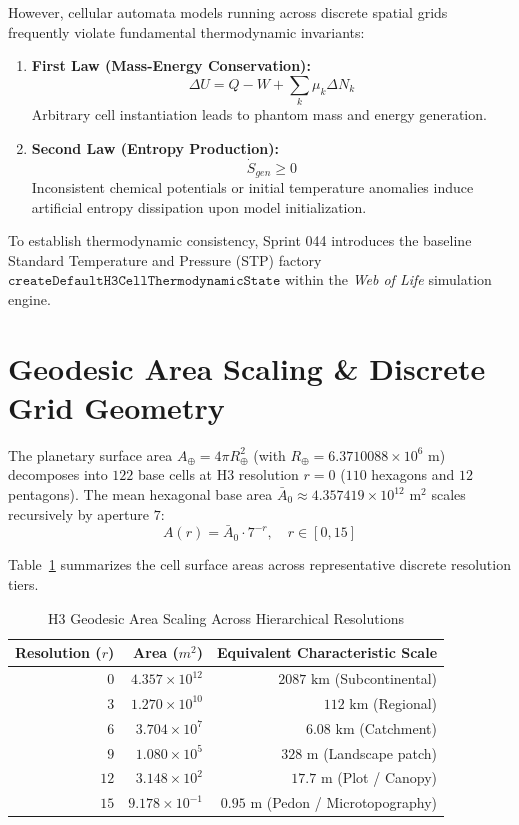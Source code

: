\documentclass[10pt,journal,compsoc]{IEEEtran}
\begin{document}
However, cellular automata models running across discrete spatial grids frequently violate fundamental thermodynamic invariants:
\begin{enumerate}
    \item \textbf{First Law (Mass-Energy Conservation):} 
    \begin{equation}
        \Delta U = Q - W + \sum_k \mu_k \Delta N_k
    \end{equation}
    Arbitrary cell instantiation leads to phantom mass and energy generation.
    \item \textbf{Second Law (Entropy Production):} 
    \begin{equation}
        \dot{S}_{gen} \ge 0
    \end{equation}
    Inconsistent chemical potentials or initial temperature anomalies induce artificial entropy dissipation upon model initialization.
\end{enumerate}

To establish thermodynamic consistency, Sprint 044 introduces the baseline Standard Temperature and Pressure (STP) factory $\mathtt{createDefaultH3CellThermodynamicState}$ within the \textit{Web of Life} simulation engine.

\section{Geodesic Area Scaling \& Discrete Grid Geometry}
The planetary surface area $A_{\oplus} = 4\pi R_{\oplus}^2$ (with $R_{\oplus} = 6.3710088 \times 10^6 \text{ m}$) decomposes into $122$ base cells at H3 resolution $r = 0$ ($110$ hexagons and $12$ pentagons). The mean hexagonal base area $\bar{A}_0 \approx 4.357419 \times 10^{12} \text{ m}^2$ scales recursively by aperture $7$:
\begin{equation}
    A(r) = \bar{A}_0 \cdot 7^{-r}, \quad r \in [0, 15]
\end{equation}

Table~\ref{tab:h3_areas} summarizes the cell surface areas across representative discrete resolution tiers.

\begin{table}[htbp]
\caption{H3 Geodesic Area Scaling Across Hierarchical Resolutions}
\label{tab:h3_areas}
\centering
\begin{tabular}{@{}rrr@{}}
\toprule
\textbf{Resolution ($r$)} & \textbf{Area ($m^2$)} & \textbf{Equivalent Characteristic Scale} \\ \midrule
$0$ & $4.357 \times 10^{12}$ & $2087 \text{ km}$ (Subcontinental) \\
$3$ & $1.270 \times 10^{10}$ & $112 \text{ km}$ (Regional) \\
$6$ & $3.704 \times 10^{7}$  & $6.08 \text{ km}$ (Catchment) \\
$9$ & $1.080 \times 10^{5}$  & $328 \text{ m}$ (Landscape patch) \\
$12$ & $3.148 \times 10^{2}$  & $17.7 \text{ m}$ (Plot / Canopy) \\
$15$ & $9.178 \times 10^{-1}$ & $0.95 \text{ m}$ (Pedon / Microtopography) \\
\bottomrule
\end{tabular}
\end{table}
\end{document}
